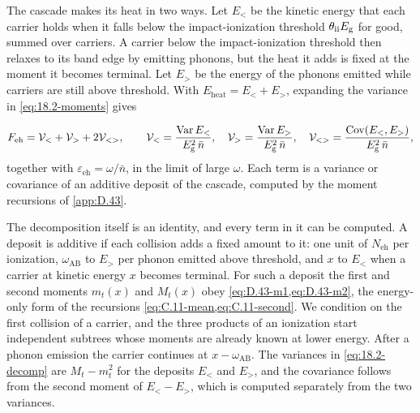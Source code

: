 The cascade makes its heat in two ways. Let $E_<$ be the kinetic energy that each carrier holds when it falls below the impact-ionization threshold $\theta_{\mathrm{ii}}E_{\mathrm{g}}$ for good, summed over carriers. A carrier below the impact-ionization threshold then relaxes to its band edge by emitting phonons, but the heat it adds is fixed at the moment it becomes terminal. Let $E_>$ be the energy of the phonons emitted while carriers are still above threshold. With $E_{\mathrm{heat}} = E_< + E_>$, expanding the variance in \cref{eq:18.2-moments} gives
\begin{keyresult}
\begin{equation}
  F_{\mathrm{eh}} = \mathcal{V}_< + \mathcal{V}_> + 2\mathcal{V}_{<>} , \qquad
  \mathcal{V}_< = \frac{\operatorname{Var}E_<}{E_{\mathrm{g}}^2\,\bar n} , \quad
  \mathcal{V}_> = \frac{\operatorname{Var}E_>}{E_{\mathrm{g}}^2\,\bar n} , \quad
  \mathcal{V}_{<>} = \frac{\operatorname{Cov}(E_<, E_>)}{E_{\mathrm{g}}^2\,\bar n} ,
  \label{eq:18.2-decomp}
\end{equation}
together with $\varepsilon_{\mathrm{eh}} = \omega/\bar n$, in the limit of large $\omega$. Each term is a variance or covariance of an additive deposit of the cascade, computed by the moment recursions of \cref{app:D.43}.
\end{keyresult}
\noindent The decomposition itself is an identity, and every term in it can be computed. A deposit is additive if each collision adds a fixed amount to it: one unit of $N_{\mathrm{eh}}$ per ionization, $\omega_{\mathrm{AB}}$ to $E_>$ per phonon emitted above threshold, and $x$ to $E_<$ when a carrier at kinetic energy $x$ becomes terminal. For such a deposit the first and second moments $m_t(x)$ and $M_t(x)$ obey \cref{eq:D.43-m1,eq:D.43-m2}, the energy-only form of the recursions \cref{eq:C.11-mean,eq:C.11-second}. We condition on the first collision of a carrier, and the three products of an ionization start independent subtrees whose moments are already known at lower energy. After a phonon emission the carrier continues at $x - \omega_{\mathrm{AB}}$. The variances in \cref{eq:18.2-decomp} are $M_t - m_t^2$ for the deposits $E_<$ and $E_>$, and the covariance follows from the second moment of $E_< - E_>$, which is computed separately from the two variances.


